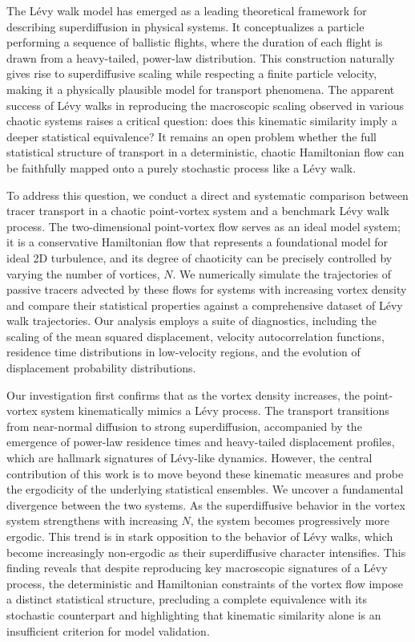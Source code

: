 \documentclass[]{article}
\begin{document}
The Lévy walk model has emerged as a leading theoretical framework for describing superdiffusion in physical systems. It conceptualizes a particle performing a sequence of ballistic flights, where the duration of each flight is drawn from a heavy-tailed, power-law distribution. This construction naturally gives rise to superdiffusive scaling while respecting a finite particle velocity, making it a physically plausible model for transport phenomena. The apparent success of Lévy walks in reproducing the macroscopic scaling observed in various chaotic systems raises a critical question: does this kinematic similarity imply a deeper statistical equivalence? It remains an open problem whether the full statistical structure of transport in a deterministic, chaotic Hamiltonian flow can be faithfully mapped onto a purely stochastic process like a Lévy walk.

To address this question, we conduct a direct and systematic comparison between tracer transport in a chaotic point-vortex system and a benchmark Lévy walk process. The two-dimensional point-vortex flow serves as an ideal model system; it is a conservative Hamiltonian flow that represents a foundational model for ideal 2D turbulence, and its degree of chaoticity can be precisely controlled by varying the number of vortices, $N$. We numerically simulate the trajectories of passive tracers advected by these flows for systems with increasing vortex density and compare their statistical properties against a comprehensive dataset of Lévy walk trajectories. Our analysis employs a suite of diagnostics, including the scaling of the mean squared displacement, velocity autocorrelation functions, residence time distributions in low-velocity regions, and the evolution of displacement probability distributions.

Our investigation first confirms that as the vortex density increases, the point-vortex system kinematically mimics a Lévy process. The transport transitions from near-normal diffusion to strong superdiffusion, accompanied by the emergence of power-law residence times and heavy-tailed displacement profiles, which are hallmark signatures of Lévy-like dynamics. However, the central contribution of this work is to move beyond these kinematic measures and probe the ergodicity of the underlying statistical ensembles. We uncover a fundamental divergence between the two systems. As the superdiffusive behavior in the vortex system strengthens with increasing $N$, the system becomes progressively more ergodic. This trend is in stark opposition to the behavior of Lévy walks, which become increasingly non-ergodic as their superdiffusive character intensifies. This finding reveals that despite reproducing key macroscopic signatures of a Lévy process, the deterministic and Hamiltonian constraints of the vortex flow impose a distinct statistical structure, precluding a complete equivalence with its stochastic counterpart and highlighting that kinematic similarity alone is an insufficient criterion for model validation.
\end{document}
